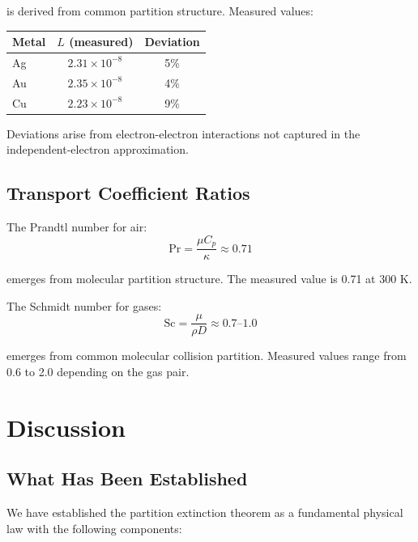 \documentclass[twocolumn,10pt,aps,prd,superscriptaddress,nofootinbib]{revtex4-2}
\theoremstyle{remark}
\begin{document}
is derived from common partition structure. Measured values:

\begin{center}
\begin{tabular}{lcc}
\toprule
Metal & $L$ (measured) & Deviation \\
\midrule
Ag & $2.31 \times 10^{-8}$ & 5\% \\
Au & $2.35 \times 10^{-8}$ & 4\% \\
Cu & $2.23 \times 10^{-8}$ & 9\% \\
\bottomrule
\end{tabular}
\end{center}

Deviations arise from electron-electron interactions not captured in the independent-electron approximation.

\subsection{Transport Coefficient Ratios}

The Prandtl number for air:
\begin{equation}
\text{Pr} = \frac{\mu C_p}{\kappa} \approx 0.71
\label{eq:prandtl}
\end{equation}

emerges from molecular partition structure. The measured value is 0.71 at 300 K.

The Schmidt number for gases:
\begin{equation}
\text{Sc} = \frac{\mu}{\rho D} \approx 0.7\text{--}1.0
\label{eq:schmidt}
\end{equation}

emerges from common molecular collision partition. Measured values range from 0.6 to 2.0 depending on the gas pair.


\section{Discussion}
\label{sec:discussion}

\subsection{What Has Been Established}

We have established the partition extinction theorem as a fundamental physical law with the following components:
\end{document}
